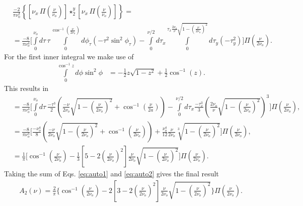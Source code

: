 \documentclass{osa-article}
\begin{document}
\begin{align}
  &\frac{-2}{\pi\nu_0^4}\left\{\left[\nu_x\, \Pi\left(\frac{\nu}{\nu_o}\right)\right] \star_2^y \left[\nu_x\, \Pi\left(\frac{\nu}{\nu_o}\right)\right]\right\} = \\
  &=  \frac{-8}{\pi\nu_o^4}\Bigg[\int\limits_0^{\nu_o} d\tau\, \tau \int\limits_0^{\cos^{-1}\left(\frac{\nu}{2\nu_o}\right)}d\phi_{\tau}(-\tau^2\sin^2\phi_{\tau}) - \int\limits_0^{\nu/2}d\tau_x \int\limits_0^{\tau_x \frac{2\nu_o}{\nu}\sqrt{1 - \left(\frac{\nu}{2\nu_o}\right)^2}}d\tau_y(-\tau_y^2)\Bigg]\Pi\left(\frac{\nu}{2\nu_o}\right).
\end{align}
For the first inner integral we make use of
\begin{align}
  \int\limits_0^{\cos^{-1}z} d\phi \sin^2\phi &= -\frac{1}{2}z\sqrt{1 - z^2} + \frac{1}{2}\cos^{-1}(z).
\end{align}
This results in
\begin{align}
  &=\frac{-8}{\pi\nu_o^4}\Bigg[\int\limits_0^{\nu_o} d\tau\, \frac{-\tau^3}{2}\left(\frac{-\nu}{2\nu_o}\sqrt{1 - \left(\frac{\nu}{2\nu_o}\right)^2} + \cos^{-1}\left(\frac{\nu}{2a}\right)\right) - \int\limits_0^{\nu/2}d\tau_x \frac{-\tau_x^3}{3}\left(\frac{2 \nu_o}{\nu}\sqrt{1 - \left(\frac{\nu}{2\nu_o}\right)^2}\right)^3\Bigg]\Pi\left(\frac{\nu}{2\nu_o}\right),\\
  &=  \frac{-8}{\pi\nu_o^4}\Bigg[\frac{-\nu_o^4}{8}\left(\frac{-\nu}{2\nu_o}\sqrt{1 - \left(\frac{\nu}{2\nu_o}\right)^2} + \cos^{-1}\left(\frac{\nu}{2\nu_o}\right) \right) + \frac{\nu_o^4}{12}\frac{\nu}{2\nu_o}\sqrt[3]{1 - \left(\frac{\nu}{2\nu_o}\right)^2}\Bigg]\Pi\left(\frac{\nu}{2\nu_o}\right),\\
  &=  \frac{1}{\pi}\Bigg[\cos^{-1}\left(\frac{\nu}{2\nu_o}\right) - \frac{1}{3}\left[5 - 2\left(\frac{\nu}{2\nu_o}\right)^2\right]\frac{\nu}{2\nu_o}\sqrt{1 - \left(\frac{\nu}{2\nu_o}\right)^2}\Bigg]\Pi\left(\frac{\nu}{2\nu_o}\right). \label{eq:auto2}
\end{align}
Taking the sum of Eqs. \ref{eq:auto1} and \ref{eq:auto2} gives the final result
\begin{align}
  A_2(\nu) = \frac{2}{\pi}\Bigg\{\cos^{-1}\left(\frac{\nu}{2\nu_o}\right) - 2\left[3 - 2\left(\frac{\nu}{2\nu_o}\right)^2\right]\frac{\nu}{2\nu_o}\sqrt{1 - \left(\frac{\nu}{2\nu_o}\right)^2}\Bigg\}\Pi\left(\frac{\nu}{2\nu_o}\right). 
\end{align}
\end{document}
